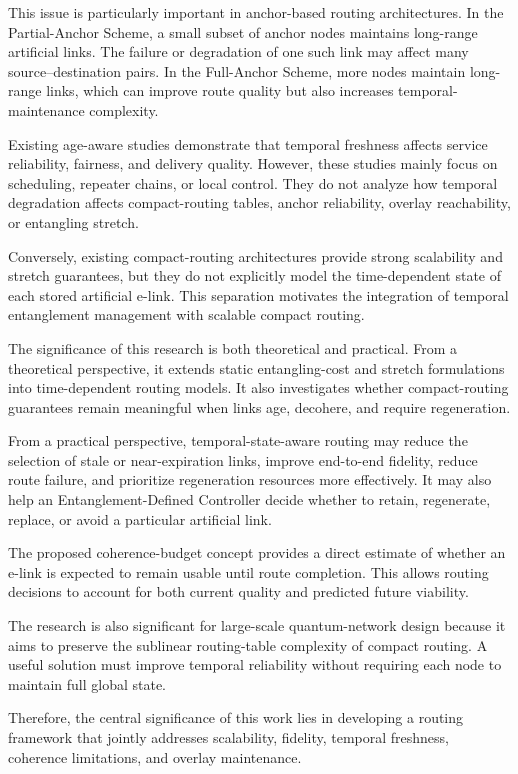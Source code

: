 This issue is particularly important in anchor-based routing architectures. In the Partial-Anchor Scheme, a small subset of anchor nodes maintains long-range artificial links. The failure or degradation of one such link may affect many source--destination pairs. In the Full-Anchor Scheme, more nodes maintain long-range links, which can improve route quality but also increases temporal-maintenance complexity.

Existing age-aware studies demonstrate that temporal freshness affects service reliability, fairness, and delivery quality. However, these studies mainly focus on scheduling, repeater chains, or local control. They do not analyze how temporal degradation affects compact-routing tables, anchor reliability, overlay reachability, or entangling stretch.

Conversely, existing compact-routing architectures provide strong scalability and stretch guarantees, but they do not explicitly model the time-dependent state of each stored artificial e-link. This separation motivates the integration of temporal entanglement management with scalable compact routing.

The significance of this research is both theoretical and practical. From a theoretical perspective, it extends static entangling-cost and stretch formulations into time-dependent routing models. It also investigates whether compact-routing guarantees remain meaningful when links age, decohere, and require regeneration.

From a practical perspective, temporal-state-aware routing may reduce the selection of stale or near-expiration links, improve end-to-end fidelity, reduce route failure, and prioritize regeneration resources more effectively. It may also help an Entanglement-Defined Controller decide whether to retain, regenerate, replace, or avoid a particular artificial link.

The proposed coherence-budget concept provides a direct estimate of whether an e-link is expected to remain usable until route completion. This allows routing decisions to account for both current quality and predicted future viability.

The research is also significant for large-scale quantum-network design because it aims to preserve the sublinear routing-table complexity of compact routing. A useful solution must improve temporal reliability without requiring each node to maintain full global state.

Therefore, the central significance of this work lies in developing a routing framework that jointly addresses scalability, fidelity, temporal freshness, coherence limitations, and overlay maintenance.
